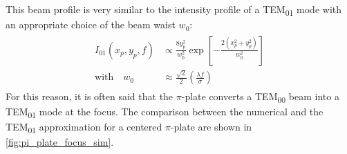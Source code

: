 This beam profile is very similar to the intensity profile of a TEM\textsubscript{01} mode with an appropriate choice of the beam waist $w_0$:
\begin{align}
\label{eqn:TEM01_mode}
\begin{split}
I_{01}(x_p,y_p,f) &\propto \frac{8 y_p^2}{w_0^2} \exp\left[- \frac{2(x_p^2+y_p^2)}{w_0^2}\right] \\
\textrm{with} \quad w_0 &\approx \frac{\sqrt{2}}{2} \left( \frac{ \lambda f}{\sigma} \right)
\end{split}
\end{align}
For this reason, it is often said that the $\pi$-plate converts a TEM\textsubscript{00} beam into a TEM\textsubscript{01} mode at the focus. The comparison between the numerical and the TEM\textsubscript{01} approximation for a centered $\pi$-plate are shown in \cref{fig:pi_plate_focus_sim}.
